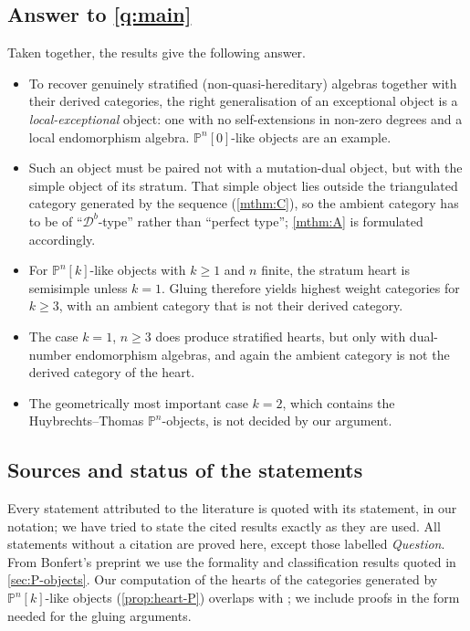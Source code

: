\documentclass[11pt,reqno]{amsart}
\theoremstyle{plain}
\theoremstyle{definition}
\theoremstyle{remark}
\newcommand{\Db}{\mathcal{D}^b}
\newcommand{\Pn}[2]{\mathbb{P}^{#1}[#2]}
\begin{document}
\subsection*{Answer to \cref{q:main}}
Taken together, the results give the following answer.
\begin{itemize}
\item To recover genuinely stratified (non-quasi-hereditary) algebras together with their derived categories, the right generalisation of an exceptional object is a \emph{local-exceptional} object: one with no self-extensions in non-zero degrees and a local endomorphism algebra. $\Pn n0$-like objects are an example.
\item Such an object must be paired not with a mutation-dual object, but with the simple object of its stratum. That simple object lies outside the triangulated category generated by the sequence (\cref{mthm:C}), so the ambient category has to be of ``$\Db$-type'' rather than ``perfect type''; \cref{mthm:A} is formulated accordingly.
\item For $\Pn nk$-like objects with $k\ge1$ and $n$ finite, the stratum heart is semisimple unless $k=1$. Gluing therefore yields highest weight categories for $k\ge3$, with an ambient category that is not their derived category.
\item The case $k=1$, $n\ge3$ does produce stratified hearts, but only with dual-number endomorphism algebras, and again the ambient category is not the derived category of the heart.
\item The geometrically most important case $k=2$, which contains the Huybrechts--Thomas $\mathbb{P}^n$-objects, is not decided by our argument.
\end{itemize}

\subsection*{Sources and status of the statements}
Every statement attributed to the literature is quoted with its statement, in our notation; we have tried to state the cited results exactly as they are used. All statements without a citation are proved here, except those labelled \emph{Question}. From Bonfert's preprint \cite{Bonf26} we use the formality and classification results quoted in \cref{sec:P-objects}. Our computation of the hearts of the categories generated by $\Pn nk$-like objects (\cref{prop:heart-P}) overlaps with \cite[Lemmas~3.11 and~4.15]{Bonf26}; we include proofs in the form needed for the gluing arguments.
\end{document}
